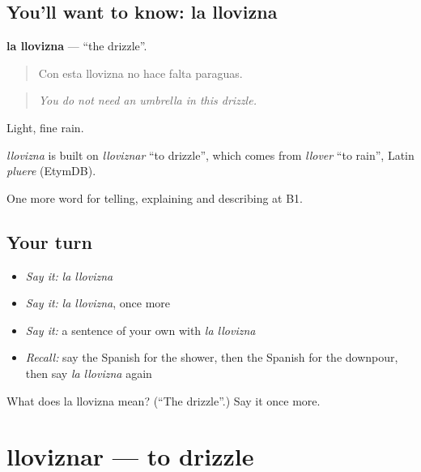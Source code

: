 \subsection*{You'll want to know: la llovizna}
\textbf{la llovizna} — \textquotedblleft{}the drizzle\textquotedblright{}.

\begin{quote}
Con esta llovizna no hace falta paraguas.
\end{quote}

\begin{quote}
\emph{You do not need an umbrella in this drizzle.}
\end{quote}

Light, fine rain.

\begin{cousinweb}
\emph{llovizna} is built on \emph{lloviznar} \textquotedblleft{}to drizzle\textquotedblright{}, which comes from \emph{llover} \textquotedblleft{}to rain\textquotedblright{}, Latin \emph{pluere} (EtymDB).
\end{cousinweb}

\begin{grammarlens}[title={What you've built}]
One more word for telling, explaining and describing at B1.
\end{grammarlens}

\subsection*{Your turn}
\begin{itemize}
\raggedright
  \item \emph{Say it:} \emph{la llovizna}
  \item \emph{Say it:} \emph{la llovizna}, once more
  \item \emph{Say it:} a sentence of your own with \emph{la llovizna}
  \item \emph{Recall:} say the Spanish for the shower, then the Spanish for the downpour, then say \emph{la llovizna} again
\end{itemize}

\begin{tcolorbox}[breakable,colback=teal!4,colframe=teal!35!black,title={Before you move on}]
What does la llovizna mean? (\textquotedblleft{}The drizzle\textquotedblright{}.) Say it once more.
\end{tcolorbox}
\section[lloviznar]{lloviznar — to drizzle}

